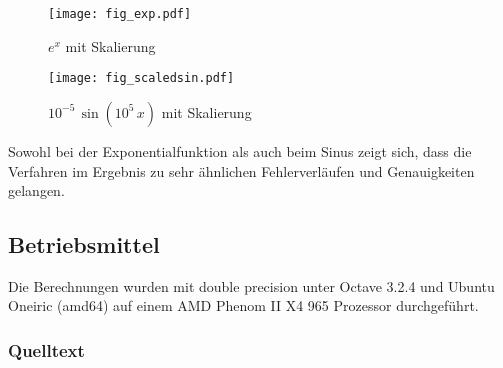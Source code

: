 \documentclass{scrartcl}
\begin{document}
\begin{figure}[!htb]
\centering
\texttt{[image: fig\_exp.pdf]}
\caption{\(e^x\) mit Skalierung}
\label{fig:exp_s}
\end{figure}

\begin{figure}[!htb]
\centering
\texttt{[image: fig\_scaledsin.pdf]}
\caption{\(10^{-5}\, \sin(10^5\, x)\) mit Skalierung}
\label{fig:sin_s}
\end{figure}

Sowohl bei der Exponentialfunktion als auch beim Sinus zeigt sich, dass die Verfahren im Ergebnis zu sehr ähnlichen Fehlerverläufen und Genauigkeiten gelangen.


\subsection{Betriebsmittel}

Die Berechnungen wurden mit double precision unter Octave 3.2.4 und Ubuntu
Oneiric (amd64) auf einem AMD Phenom II X4 965 Prozessor durchgeführt.

\subsubsection{Quelltext}


\end{document}
